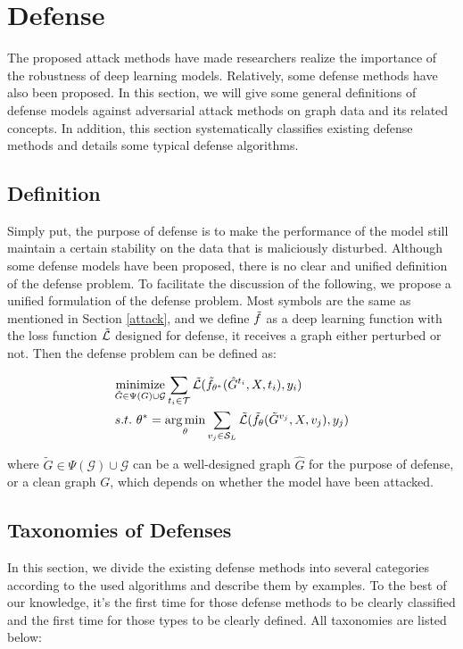 
\section{Defense}
\label{defense}
The proposed attack methods have made researchers realize the importance of the robustness of deep learning models. Relatively, some defense methods have also been proposed. In this section, we will give some general definitions of defense models against adversarial attack methods on graph data and its related concepts. In addition, this section systematically classifies existing defense methods and details some typical defense algorithms.

\subsection{Definition}
\label{defenseDefinition}
Simply put, the purpose of defense is to make the performance of the model still maintain a certain stability on the data that is maliciously disturbed. Although some defense models have been proposed, there is no clear and unified definition of the defense problem. To facilitate the discussion of the following, we propose a unified formulation of the defense problem.
 Most symbols are the same as mentioned in Section \ref{attack}, and we define $\Tilde{f}$ as a deep learning function with the loss function $\mathcal{\Tilde{L}}$ designed for defense, it receives a graph either perturbed or not. Then the defense problem can be defined as:

\begin{equation}
	\begin{split}
		& \underset{\hat{G} \in {\Psi(G)}\cup{\mathcal{G}}}{\text{minimize}} \sum_{t_i \in \mathcal{T}} \mathcal{\Tilde{L}}(\Tilde{f}_{\theta^{\ast}}(\hat{G}^{t_i}, X, t_i), y_i)  \\
		& s.t. \ \theta^{\ast} = \mathop{\arg \min}_{\theta} \sum_{v_j \in \mathcal{S}_L}\mathcal{\Tilde{L}}(\Tilde{f}_{\theta}(\tilde{G}^{v_j}, X, v_j), y_j)
	\end{split}
\end{equation}

where $\tilde{G} \in {\Psi(\mathcal{G})}\cup{\mathcal{G}}$ can be a well-designed graph $\hat{G}$ for the purpose of defense, or a clean graph $G$, which depends on whether the model have been attacked.

\subsection{Taxonomies of Defenses}
In this section, we divide the existing defense methods into several categories according to the used algorithms and describe them by examples. To the best of our knowledge, it's the first time for those defense methods to be clearly classified and the first time for those types to be clearly defined. All taxonomies are listed  below:

